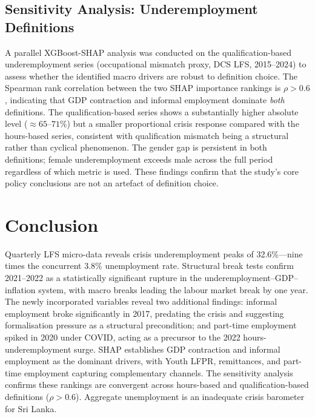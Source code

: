\documentclass[sigconf]{acmart}
\begin{document}
\subsection{Sensitivity Analysis: Underemployment Definitions}
\label{sec:sensitivity}

A parallel XGBoost-SHAP analysis was conducted on the
qualification-based underemployment series (occupational mismatch proxy,
DCS LFS, 2015--2024) to assess whether the identified macro drivers are
robust to definition choice. The Spearman rank correlation between the two
SHAP importance rankings is $\rho{>}0.6$, indicating that GDP contraction
and informal employment dominate \emph{both} definitions. The
qualification-based series shows a substantially higher absolute level
(${\approx}65$--$71\%$) but a smaller proportional crisis response compared
with the hours-based series, consistent with qualification mismatch being a
structural rather than cyclical phenomenon. The gender gap is persistent in
both definitions; female underemployment exceeds male across the full period
regardless of which metric is used. These findings confirm that the
study's core policy conclusions are not an artefact of definition choice.

\section{Conclusion}

Quarterly LFS micro-data reveals crisis underemployment peaks of
32.6\%---nine times the concurrent 3.8\% unemployment rate. Structural
break tests confirm 2021--2022 as a statistically significant rupture in the
underemployment--GDP--inflation system, with macro breaks leading the labour
market break by one year. The newly incorporated variables reveal two
additional findings: informal employment broke significantly in 2017,
predating the crisis and suggesting formalisation pressure as a structural
precondition; and part-time employment spiked in 2020 under COVID, acting
as a precursor to the 2022 hours-underemployment surge. SHAP establishes
GDP contraction and informal employment as the dominant drivers, with Youth
LFPR, remittances, and part-time employment capturing complementary channels.
The sensitivity analysis confirms these rankings are convergent across
hours-based and qualification-based definitions ($\rho{>}0.6$). Aggregate
unemployment is an inadequate crisis barometer for Sri Lanka.
\end{document}
